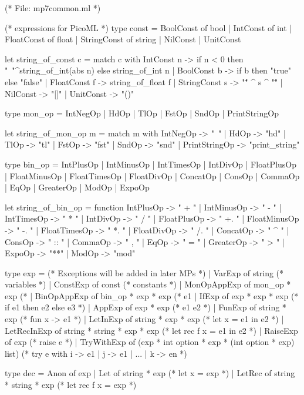 (* File: mp7common.ml *)

(* expressions for PicoML *)
type const = BoolConst of bool | IntConst of int | FloatConst of float
           | StringConst of string | NilConst | UnitConst 

let string_of_const c =
    match c 
    with IntConst n    -> if n < 0 then "~"^string_of_int(abs n) else string_of_int n
       | BoolConst b   -> if b then "true" else "false"
       | FloatConst f  -> string_of_float f
       | StringConst s -> "\"" ^ s ^ "\""
       | NilConst      -> "[]"
       | UnitConst     -> "()"

type mon_op = IntNegOp | HdOp | TlOp | FstOp | SndOp | PrintStringOp

let string_of_mon_op m =
    match m
    with IntNegOp   -> "~"
       | HdOp  -> "hd"
       | TlOp  -> "tl"
       | FstOp   -> "fst"
       | SndOp   -> "snd"
       | PrintStringOp  -> "print_string"

type bin_op = IntPlusOp | IntMinusOp | IntTimesOp | IntDivOp
           | FloatPlusOp | FloatMinusOp | FloatTimesOp | FloatDivOp 
           | ConcatOp | ConsOp | CommaOp | EqOp | GreaterOp 
           | ModOp | ExpoOp

let string_of_bin_op = function 
     IntPlusOp  -> " + "
   | IntMinusOp -> " - "
   | IntTimesOp -> " * "
   | IntDivOp -> " / "
   | FloatPlusOp -> " +. "
   | FloatMinusOp -> " -. "
   | FloatTimesOp -> " *. "
   | FloatDivOp -> " /. "
   | ConcatOp -> " ^ "
   | ConsOp -> " :: "
   | CommaOp -> " , "
   | EqOp  -> " = "
   | GreaterOp -> " > "
   | ExpoOp -> "**"
   | ModOp   -> "mod"

type exp =  (* Exceptions will be added in later MPs *)
   | VarExp of string                    (* variables *)
   | ConstExp of const                   (* constants *)
   | MonOpAppExp of mon_op * exp         (* %
   | BinOpAppExp of bin_op * exp * exp   (* e1 %
   | IfExp of exp * exp * exp            (* if e1 then e2 else e3 *)
   | AppExp of exp * exp                 (* e1 e2 *) 
   | FunExp of string * exp              (* fun x -> e1 *)
   | LetInExp of string * exp * exp      (* let x = e1 in e2 *)
   | LetRecInExp of string * string * exp * exp (* let rec f x = e1 in e2 *)
   | RaiseExp of exp                     (* raise e *)
   | TryWithExp of (exp * int option * exp * (int option * exp) list)
		                   (* try e with i -> e1 | j -> e1 | ... | k -> en *)

type dec =
     Anon of exp
   | Let of string * exp                 (* let x = exp *)
   | LetRec of string * string * exp     (* let rec f x = exp *)

